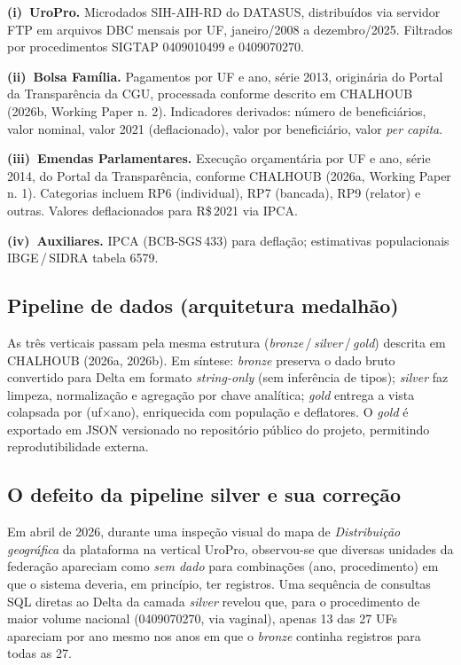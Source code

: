 \documentclass[12pt,a4paper,oneside]{article}
\newcommand{\rs}{R\$\,}
\begin{document}
\textbf{(i)~UroPro.} Microdados SIH-AIH-RD do DATASUS,
distribuídos via servidor FTP em arquivos DBC mensais por UF,
janeiro/2008 a dezembro/2025. Filtrados por procedimentos
SIGTAP 0409010499 e 0409070270.

\textbf{(ii)~Bolsa Família.} Pagamentos por UF e ano, série
2013, originária do Portal da Transparência
da CGU, processada conforme descrito em CHALHOUB (2026b,
Working Paper n. 2). Indicadores derivados: número de
beneficiários, valor nominal, valor 2021 (deflacionado),
valor por beneficiário, valor \textit{per capita}.

\textbf{(iii)~Emendas Parlamentares.} Execução orçamentária por
UF e ano, série 2014, do Portal da
Transparência, conforme CHALHOUB (2026a, Working Paper n. 1).
Categorias incluem RP6 (individual), RP7 (bancada), RP9
(relator) e outras. Valores deflacionados para \rs 2021 via
IPCA.

\textbf{(iv)~Auxiliares.} IPCA (BCB-SGS\,433) para deflação;
estimativas populacionais IBGE\,/\,SIDRA tabela 6579.

\subsection{Pipeline de dados (arquitetura medalhão)}

As três verticais passam pela mesma estrutura
(\textit{bronze}\,/\,\textit{silver}\,/\,\textit{gold})
descrita em CHALHOUB (2026a, 2026b). Em síntese:
\textit{bronze} preserva o dado bruto convertido para Delta
em formato \textit{string-only} (sem inferência de tipos);
\textit{silver} faz limpeza, normalização e agregação por
chave analítica; \textit{gold} entrega a vista colapsada por
(uf$\times$ano), enriquecida com população e deflatores. O
\textit{gold} é exportado em JSON versionado no repositório
público do projeto, permitindo reprodutibilidade externa.

\subsection{O defeito da pipeline silver e sua correção}\label{sub:bug}

Em abril de 2026, durante uma inspeção visual do mapa de
\textit{Distribuição geográfica} da plataforma na vertical
UroPro, observou-se que diversas unidades da federação
apareciam como \textit{sem dado} para combinações
(ano, procedimento) em que o sistema deveria, em princípio,
ter registros. Uma sequência de consultas SQL diretas ao Delta
da camada \textit{silver} revelou que, para o procedimento de
maior volume nacional (0409070270, via vaginal), apenas 13 das
27 UFs apareciam por ano \textemdash{} mesmo nos anos em que o
\textit{bronze} continha registros para todas as 27.
\end{document}
